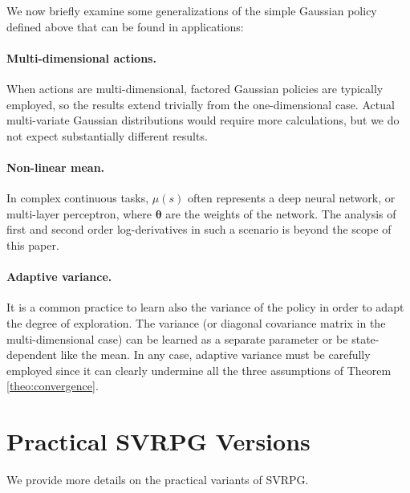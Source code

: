 \documentclass{article}
\theoremstyle{remark}
\theoremstyle{definition}
\newcommand{\vtheta}{\boldsymbol{\theta}}
\begin{document}
We now briefly examine some generalizations of the simple Gaussian policy defined above that can be found in applications:

\paragraph{Multi-dimensional actions.}
When actions are multi-dimensional, factored Gaussian policies are typically employed, so the results extend trivially from the one-dimensional case. Actual multi-variate Gaussian distributions would require more calculations, but we do not expect substantially different results.

\paragraph{Non-linear mean.}
In complex continuous tasks, $\mu(s)$ often represents a deep neural network, or multi-layer perceptron, where $\vtheta$ are the weights of the network. The analysis of first and second order log-derivatives in such a scenario is beyond the scope of this paper.

\paragraph{Adaptive variance.}
It is a common practice to learn also the variance of the policy in order to adapt the degree of exploration. The variance (or diagonal covariance matrix in the multi-dimensional case) can be learned as a separate parameter or be state-dependent like the mean. In any case, adaptive variance must be carefully employed since it can clearly undermine all the three assumptions of Theorem \ref{theo:convergence}.

\section{Practical SVRPG Versions}\label{app:practicalsvrpg}
We provide more details on the practical variants of SVRPG.
\end{document}
